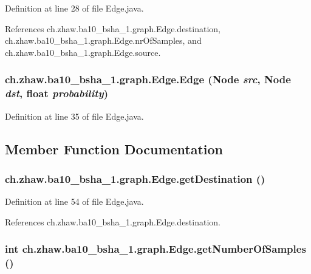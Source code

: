 Definition at line 28 of file Edge.java.

References ch.zhaw.ba10\_\-bsha\_\-1.graph.Edge.destination, ch.zhaw.ba10\_\-bsha\_\-1.graph.Edge.nrOfSamples, and ch.zhaw.ba10\_\-bsha\_\-1.graph.Edge.source.\hypertarget{classch_1_1zhaw_1_1ba10__bsha__1_1_1graph_1_1Edge_a5c64d7964986451532b6d8d2f316847f}{
\subsubsection[{Edge}]{\setlength{\rightskip}{0pt plus 5cm}ch.zhaw.ba10\_\-bsha\_\-1.graph.Edge.Edge ({\bf Node} {\em src}, \/  {\bf Node} {\em dst}, \/  float {\em probability})}}
\label{classch_1_1zhaw_1_1ba10__bsha__1_1_1graph_1_1Edge_a5c64d7964986451532b6d8d2f316847f}


Definition at line 35 of file Edge.java.

\subsection{Member Function Documentation}
\hypertarget{classch_1_1zhaw_1_1ba10__bsha__1_1_1graph_1_1Edge_a6f3e5cd35728de7647168f1ba97e38df}{
\subsubsection[{getDestination}]{ ch.zhaw.ba10\_\-bsha\_\-1.graph.Edge.getDestination ()}}
\label{classch_1_1zhaw_1_1ba10__bsha__1_1_1graph_1_1Edge_a6f3e5cd35728de7647168f1ba97e38df}


Definition at line 54 of file Edge.java.

References ch.zhaw.ba10\_\-bsha\_\-1.graph.Edge.destination.\hypertarget{classch_1_1zhaw_1_1ba10__bsha__1_1_1graph_1_1Edge_aea10be56573d1755291dd0bd28256669}{
\subsubsection[{getNumberOfSamples}]{\setlength{\rightskip}{0pt plus 5cm}int ch.zhaw.ba10\_\-bsha\_\-1.graph.Edge.getNumberOfSamples ()}}
\label{classch_1_1zhaw_1_1ba10__bsha__1_1_1graph_1_1Edge_aea10be56573d1755291dd0bd28256669}


